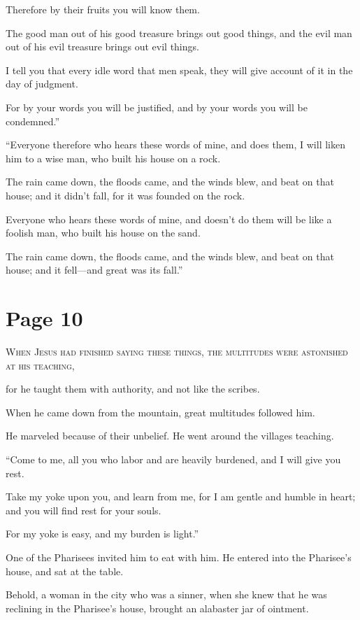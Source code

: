 Therefore by their fruits you will know them.

The good man out of his good treasure brings out good things, and the evil man out of his evil treasure brings out evil things.

I tell you that every idle word that men speak, they will give account of it in the day of judgment.

For by your words you will be justified, and by your words you will be condemned.”

“Everyone therefore who hears these words of mine, and does them, I will liken him to a wise man, who built his house on a rock.

The rain came down, the floods came, and the winds blew, and beat on that house; and it didn’t fall, for it was founded on the rock.

Everyone who hears these words of mine, and doesn’t do them will be like a foolish man, who built his house on the sand.

The rain came down, the floods came, and the winds blew, and beat on that house; and it fell—and great was its fall.”



\chapterornament
\section*{Page 10}

\lettrine{W}{hen Jesus had finished saying these things, the multitudes were astonished at his teaching,}

for he taught them with authority, and not like the scribes.

When he came down from the mountain, great multitudes followed him.

He marveled because of their unbelief. He went around the villages teaching.

“Come to me, all you who labor and are heavily burdened, and I will give you rest.

Take my yoke upon you, and learn from me, for I am gentle and humble in heart; and you will find rest for your souls.

For my yoke is easy, and my burden is light.”

One of the Pharisees invited him to eat with him. He entered into the Pharisee’s house, and sat at the table.

Behold, a woman in the city who was a sinner, when she knew that he was reclining in the Pharisee’s house, brought an alabaster jar of ointment.


